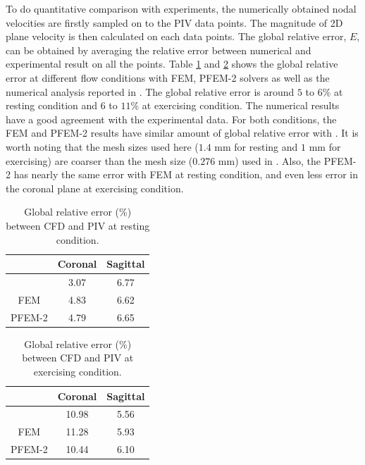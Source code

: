 To do quantitative comparison with experiments, the numerically obtained nodal velocities are firstly sampled on to the PIV data points. The magnitude of 2D plane velocity is then calculated on each data points. The global relative error, $E$, can be obtained by averaging the relative error between numerical and experimental result on all the points. Table \ref{tab:rest} and \ref{tab:exercise} shows the global relative error at different flow conditions with FEM, PFEM-2 solvers as well as the numerical analysis reported in \cite{craven_cfd}. The global relative error is around $5$ to $6$\% at resting condition and $6$ to $11$\% at exercising condition. The numerical results have a good agreement with the experimental data. For both conditions, the FEM and PFEM-2 results have similar amount of global relative error with \cite{craven_cfd}. It is worth noting that the mesh sizes used here ($1.4$ mm for resting and $1$ mm for exercising) are coarser than the mesh size ($0.276$ mm) used in \cite{craven_cfd}. Also, the PFEM-2 has nearly the same error with FEM at resting condition, and even less error in the coronal plane at exercising condition.

\begin{table}[h!]
\caption {Global relative error (\%) between CFD and PIV at resting condition.} \label{tab:rest}
\centering
\begin{tabular}{|c|c|c|}
\hline
       & Coronal & Sagittal \\ \hline
\cite{craven_cfd}  & 3.07    & 6.77     \\ \hline
FEM    & 4.83    & 6.62     \\ \hline
PFEM-2 & 4.79    & 6.65     \\ \hline
\end{tabular}
\end{table}

\begin{table}[h!]
\caption {Global relative error (\%) between CFD and PIV at exercising condition.} \label{tab:exercise}
\centering
\begin{tabular}{|c|c|c|}
\hline
       & Coronal & Sagittal \\ \hline
\cite{craven_cfd}  & 10.98	&5.56 \\ \hline
FEM    &  11.28    &  5.93  \\ \hline
PFEM-2 &  10.44   &  6.10     \\ \hline
\end{tabular}
\end{table}
